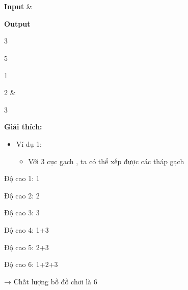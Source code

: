  

 
\begin{tabular}\hline 


\textbf{Input} & 

\textbf{Output}  
\hline


3

5

1

2 & 

3  
\hline

\end{tabular}

\textbf{Giải thích:}
\begin{itemize}
	\item 

Ví dụ  1:
\begin{itemize}
	\item 

Với 3 cục   gạch , ta có thể xếp được   các tháp gạch
\end{itemize}
\end{itemize}

Độ cao 1: 1

Độ cao 2: 2

Độ cao 3: 3

Độ cao 4: 1+3

Độ cao 5: 2+3

Độ cao 6: 1+2+3

→ Chất lượng bồ đồ chơi là 6
